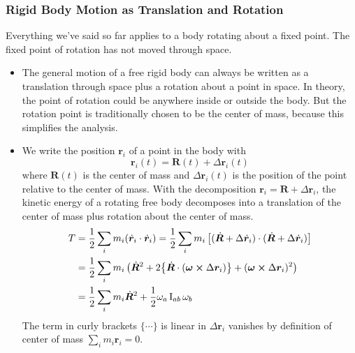 \documentclass[11pt, a4paper]{article}
\begin{document}
\subsubsection{Rigid Body Motion as Translation and Rotation}
Everything we've said so far applies to a body rotating about a fixed point. The fixed point of rotation has not moved through space.

\begin{itemize}
	\item The general motion of a free rigid body can always be written as a translation through space plus a rotation about a point in space. In theory, the point of rotation could be anywhere inside or outside the body. But the rotation point is traditionally chosen to be the center of mass, because this simplifies the analysis.
	
	\item We write the position $ \bm{r}_{i} $ of a point in the body with
	\begin{equation*}
		\bm{r}_{i}(t) = \bm{R}(t) + \Delta \bm{r}_{i}(t)
	\end{equation*}
	where $ \bm{R}(t) $ is the center of mass and $ \Delta \bm{r}_{i}(t) $ is the position of the point relative to the center of mass.	With the decomposition $ \bm{r}_{i} = \bm{R} + \Delta \bm{r}_{i} $, the kinetic energy of a rotating free body decomposes into a translation of the center of mass plus rotation about the center of mass.
	\begin{align*}
		T &= \frac{1}{2} \sum_{i} m_i (\dot{\bm{r}}_{i} \cdot \dot{\bm{r}}_{i}) = \frac{1}{2} \sum_{i} m_i \left [(\dot{\bm{R}} + \Delta \dot{\bm{r}}_{i}) \cdot (\dot{\bm{R}} + \Delta \dot{\bm{r}}_{i}) \right ]\\
		&= \frac{1}{2} \sum_{i} m_i \left(\dot{\bm{R}}^2 + 2\big \{ \dot{\bm{R}} \cdot (\bm{\omega} \cross \Delta \bm{r}_{i}) \big \} + (\bm{\omega} \cross \Delta \bm{r}_{i} )^2 \right)\\
		& = \frac{1}{2} \sum_{i} m_i \dot{\bm{R}}^{2} + \frac{1}{2} \omega_{a} \operatorname{I}_{ab} \omega_{b}
	\end{align*}
	The term in curly brackets $ \{\cdots \} $ is linear in $ \Delta  \bm{r}_{i} $ vanishes by definition of center of mass $ \sum_{i}m_i \bm{r}_i = 0 $. 
	

\end{itemize}
\end{document}
